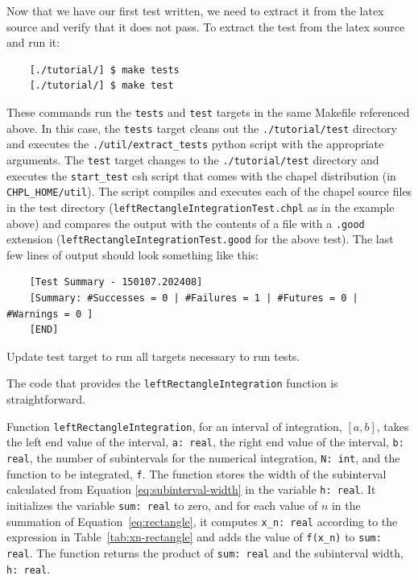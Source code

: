   \begin{seamlessnote}
    Now that we have our first test written, we need to extract it from the latex source and verify
    that it does not pass.
    To extract the test from the latex source and run it:
    \begin{verbatim}
    [./tutorial/] $ make tests
    [./tutorial/] $ make test
    \end{verbatim}
    These commands run the \lstinline{tests} and \lstinline{test} targets in the same Makefile referenced above.
    In this case, the \lstinline{tests} target cleans out the \lstinline{./tutorial/test} directory and
    executes the \lstinline{./util/extract_tests} python script with the appropriate arguments.
    The \lstinline{test} target changes to the \lstinline{./tutorial/test} directory and 
    executes the \lstinline{start_test} csh script that comes with
    the chapel distribution (in \lstinline{CHPL_HOME/util}). The script compiles and executes each of the
    chapel source files in the test directory 
    (\eg \lstinline{leftRectangleIntegrationTest.chpl} as in the example above) 
    and compares the output with the contents of a file with a \lstinline{.good} extension
    (\eg \lstinline{leftRectangleIntegrationTest.good} for the above test). 
    The last few lines of output should look something like this:
    \begin{verbatim}
    [Test Summary - 150107.202408]
    [Summary: #Successes = 0 | #Failures = 1 | #Futures = 0 | #Warnings = 0 ]
    [END]
    \end{verbatim}
  \end{seamlessnote}

  \begin{TODO}
    Update test target to run all targets necessary to run tests.
  \end{TODO}

  The code that provides the \lstinline{leftRectangleIntegration} function is straightforward.
  \begin{enumspec}
  \item{} Function \lstinline{leftRectangleIntegration}, for an interval
    of integration, $[a,b]$,
    takes the left end value of the interval, \lstinline{a: real}, the right end value
    of the interval, \lstinline{b: real}, the number of subintervals for the numerical
    integration, \lstinline{N: int}, and the function to be integrated, \lstinline{f}.
    The function stores the width of the subinterval calculated from Equation 
    \ref{eq:subinterval-width} in the variable \lstinline{h: real}. It initializes the variable
    \lstinline{sum: real} to zero, and for each value of $n$ in the summation of Equation~\ref{eq:rectangle},
    it computes \lstinline{x_n: real} according to the expression in Table~\ref{tab:xn-rectangle} and adds
    the value of \lstinline{f(x_n)} to \lstinline{sum: real}. The function returns the product of 
    \lstinline{sum: real} and the subinterval width, \lstinline{h: real}.
  \end{enumspec}

